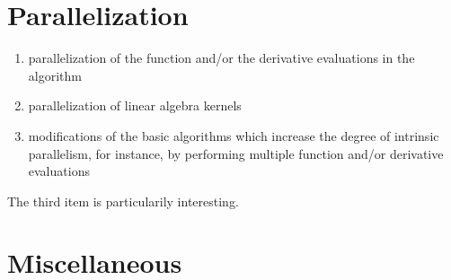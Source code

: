 \documentclass{article} %
\begin{document}
% 
% 



\section{Parallelization}


\begin{enumerate}
\item parallelization of the function and/or the derivative evaluations in the algorithm
\item parallelization of linear algebra kernels
\item modifications of the basic algorithms which increase the degree of intrinsic parallelism, for instance, by performing multiple function and/or derivative evaluations
\end{enumerate}

The third item is particularily interesting.






\section{Miscellaneous}
\end{document}
